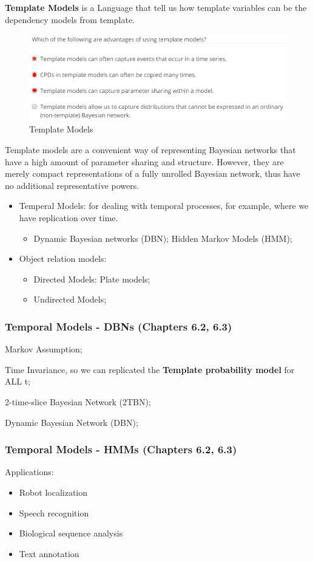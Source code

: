 \documentclass[12pt]{article}
\numberwithin{equation}{section}
\begin{document}
\textbf{Template Models} is a Language that tell us how template variables can be the dependency models from template.
\begin{figure}[H]
	\includegraphics[width=\linewidth]{PGMpics/TemplateModels.png}
	\caption{Template Models}
	\label{fig:TemplateModels}
\end{figure}
Template models are a convenient way of representing Bayesian networks that have a high amount of parameter sharing and structure. However, they are merely compact representations of a fully unrolled Bayesian network, thus have no additional representative powers.
\begin{itemize}
	\item Temperal Models: for dealing with temporal processes, for example, where we have replication over time.
	\begin{itemize}
		\item Dynamic Bayesian networks (DBN); Hidden Markov Models (HMM);
	\end{itemize}
	\item Object relation models:
	\begin{itemize}
		\item Directed Models: Plate models;
		\item Undirected Models;
	\end{itemize}
\end{itemize}

\subsubsection{Temporal Models - DBNs (Chapters 6.2, 6.3)}
Markov Assumption;

Time Invariance, so we can replicated the \textbf{Template probability model} for ALL t;

2-time-slice Bayesian Network (2TBN);

Dynamic Bayesian Network (DBN);
\subsubsection{Temporal Models - HMMs (Chapters 6.2, 6.3)}
Applications:
\begin{itemize}
	\item Robot localization
	\item Speech recognition
	\item Biological sequence analysis
	\item Text annotation
\end{itemize}
\end{document}
